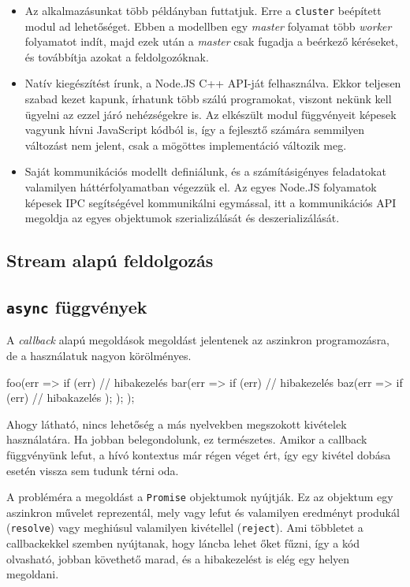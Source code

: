 \begin{itemize}
\item Az alkalmazásunkat több példányban futtatjuk.  Erre a \texttt{cluster}
  beépített modul ad lehetőséget.  Ebben a modellben egy \emph{master} folyamat
  több \emph{worker} folyamatot indít, majd ezek után a \emph{master} csak
  fugadja a beérkező kéréseket, és továbbítja azokat a feldolgozóknak.
\item Natív kiegészítést írunk, a Node.JS C++ API-ját felhasználva.  Ekkor
  teljesen szabad kezet kapunk, írhatunk több szálú programokat, viszont nekünk
  kell ügyelni az ezzel járó nehézségekre is.  Az elkészült modul függvényeit
  képesek vagyunk hívni JavaScript kódból is, így a fejlesztő számára semmilyen
  változást nem jelent, csak a mögöttes implementáció változik meg.
\item Saját kommunikációs modellt definiálunk, és a számításigényes feladatokat
  valamilyen háttérfolyamatban végezzük el.  Az egyes Node.JS folyamatok képesek
  IPC segítségével kommunikálni egymással, itt a kommunikációs API megoldja az
  egyes objektumok szerializálását és deszerializálását.
\end{itemize}

\subsection{Stream alapú feldolgozás}

\subsection{\texttt{async} függvények}

A \emph{callback} alapú megoldások megoldást jelentenek az aszinkron
programozásra, de a használatuk nagyon körölményes.

\begin{js}
foo(err => {
  if (err) {
    // hibakezelés
  }
  bar(err => {
    if (err) {
      // hibakezelés
    }
    baz(err => {
      if (err) {
        // hibakazelés
      }
    });
  });
});
\end{js}

Ahogy látható, nincs lehetőség a más nyelvekben megszokott kivételek
használatára.  Ha jobban belegondolunk, ez természetes. Amikor a callback
függvényünk lefut, a hívó kontextus már régen véget ért, így egy kivétel dobása
esetén vissza sem tudunk térni oda.

A probléméra a megoldást a \texttt{Promise} objektumok nyújtják.  Ez az objektum
egy aszinkron művelet reprezentál, mely vagy lefut és valamilyen eredményt
produkál (\texttt{resolve}) vagy meghiúsul valamilyen kivétellel
(\texttt{reject}).  Ami többletet a callbackekkel szemben nyújtanak, hogy láncba
lehet őket fűzni, így a kód olvasható, jobban követhető marad, és a hibakezelést
is elég egy helyen megoldani.

